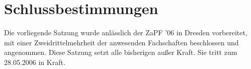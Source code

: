 \section*{Schlussbestimmungen}
Die vorliegende Satzung wurde anlässlich der ZaPF '06 in Dresden
vorbereitet, mit einer Zweidrittelmehrheit der anwesenden
Fachschaften beschlossen und angenommen. Diese Satzung setzt alle
bisherigen außer Kraft. Sie tritt zum 28.05.2006 in Kraft.



